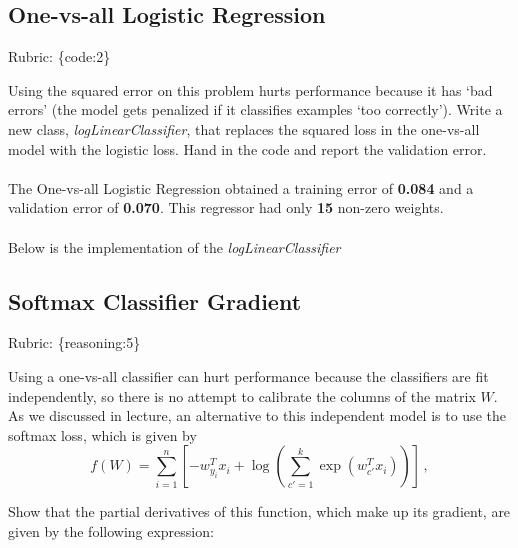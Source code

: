 \documentclass{article}
\def\rubric#1{\gre{Rubric: \{#1\}}}{}
\def\blu#1{{\color{blu}#1}}
\def\gre#1{{\color{gre}#1}}
\def\ans#1{{\color{ans}#1}}
\begin{document}
\subsection{One-vs-all Logistic Regression}
\rubric{code:2}

Using the squared error on this problem hurts performance because it has `bad errors' (the model gets penalized if it classifies examples `too correctly').
Write a new class, \emph{logLinearClassifier}, that replaces the squared loss in the one-vs-all model with the logistic loss. \blu{Hand in the code and report the validation error}. \\ \\
\ans{
    The One-vs-all Logistic Regression obtained a training error of \textbf{0.084} and a validation 
    error of \textbf{0.070}. This regressor had only \textbf{15} non-zero weights. \\ \\
    Below is the implementation of the \emph{logLinearClassifier}
}
\begin{center}
     
\end{center}


\subsection{Softmax Classifier Gradient}
\rubric{reasoning:5}

Using a one-vs-all classifier can hurt performance because the classifiers are fit independently, so there is no attempt to calibrate the columns of the matrix $W$. As we discussed in lecture, an alternative to this independent model is to use the softmax loss, which is given by
\[
f(W) = \sum_{i=1}^n \left[-w_{y_i}^Tx_i + \log\left(\sum_{c' = 1}^k \exp(w_{c'}^Tx_i)\right)\right] \, ,
\]

\blu{Show that the partial derivatives of this function, which make up its gradient, are given by the following expression:}
\end{document}
